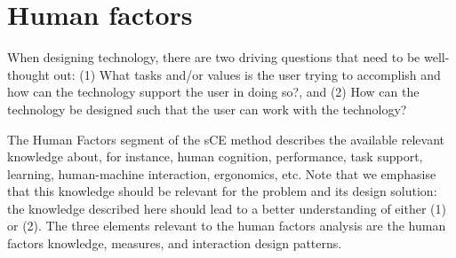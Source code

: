\section{Human factors}
\label{sec:human-factors}
When designing technology, there are two driving questions that need to be well-thought out: (1) What tasks and/or values is the user trying to accomplish and how can the technology support the user in doing so?, and (2) How can the technology be designed such that the user can work with the technology?

The Human Factors segment of the sCE method describes the available relevant knowledge about, for instance, human cognition, performance, task support, learning, human-machine interaction, ergonomics, etc. Note that we emphasise that this knowledge should be relevant for the problem and its design solution: the knowledge described here should lead to a better understanding of either (1) or (2). The three elements relevant to the human factors analysis are the human factors knowledge, measures, and interaction design patterns.

